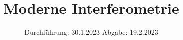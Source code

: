 

\subject{V64}
\title{Moderne Interferometrie}
\date{%
  Durchführung: 30.1.2023
  \hspace{3em}
  Abgabe: 19.2.2023
}



\maketitle
\thispagestyle{empty}
\tableofcontents
\newpage







%

\printbibliography{}


